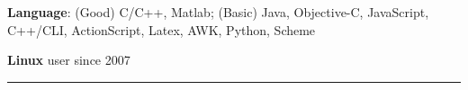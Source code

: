 \documentclass[letterpaper]{article}
\renewenvironment{itemize}{
  \begin{list}{}{
    \setlength{\leftmargin}{1.5em}
    \setlength{\itemsep}{0pt}
  }
}{
  \end{list}
}
\begin{document}
\begin{itemize}
\item \textbf{Language}: (Good) C/C++, Matlab; (Basic) Java, Objective-C, JavaScript, C++/CLI, ActionScript, Latex, AWK, Python, Scheme
\item \textbf{Linux} user since 2007
%
%
\end{itemize}

\rule{16.8cm}{0.1em}

\vspace{-1.5em}
\end{document}

